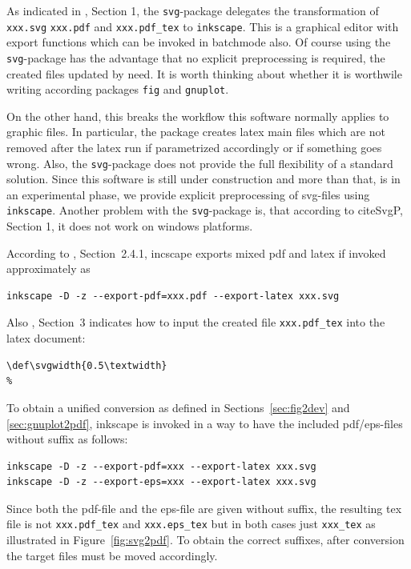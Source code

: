 \documentclass[12pt]{book}
\begin{document}
As indicated in \cite{SvgP}, Section 1, 
the {\tt svg}-package delegates the transformation 
of {\tt xxx.svg} {\tt xxx.pdf} and {\tt xxx.pdf\_tex} 
to {\tt inkscape}. 
This is a graphical editor with export functions 
which can be invoked in batchmode also. 
Of course using the {\tt svg}-package has the advantage 
that no explicit preprocessing is required, 
the created files updated by need. 
It is worth thinking about whether it is worthwile 
writing according packages {\tt fig} and {\tt gnuplot}. 

On the other hand, 
this breaks the workflow this software normally applies to graphic files. 
In particular, the package creates latex main files 
which are not removed after the latex run 
if parametrized accordingly or if something goes wrong. 
Also, the {\tt svg}-package does not provide the full flexibility 
of a standard solution. 
Since this software is still under construction 
and more than that, is in an experimental phase, 
we provide explicit preprocessing of svg-files using {\tt inkscape}. 
Another problem with the {\tt svg}-package is, 
that according to cite{SvgP}, Section 1, 
it does not work on windows platforms. 


According to \cite{SvgIncl}, Section~2.4.1, 
incscape exports mixed pdf and latex if invoked approximately as 
%
\begin{Verbatim}[fontsize=\normalsize]
inkscape -D -z --export-pdf=xxx.pdf --export-latex xxx.svg 
\end{Verbatim} 
%
Also \cite{SvgIncl}, Section~3 indicates how to input the created file 
{\tt xxx.pdf\_tex} into the latex document: 
%
\begin{verbatim}
\def\svgwidth{0.5\textwidth}
%
\end{verbatim}

To obtain a unified conversion as defined in Sections~\ref{sec:fig2dev} 
and \ref{sec:gnuplot2pdf}, 
inkscape is invoked in a way to have the included pdf/eps-files 
without suffix as follows: 
%
\begin{Verbatim}[fontsize=\normalsize]
inkscape -D -z --export-pdf=xxx --export-latex xxx.svg 
inkscape -D -z --export-eps=xxx --export-latex xxx.svg 
\end{Verbatim} 

Since both the pdf-file and the eps-file are given without suffix, 
the resulting tex file is not {\tt xxx.pdf\_tex} and {\tt xxx.eps\_tex} 
but in both cases just {\tt xxx\_tex} 
as illustrated in Figure~\ref{fig:svg2pdf}. 
To obtain the correct suffixes, 
after conversion the target files must be moved accordingly. 
\end{document}
